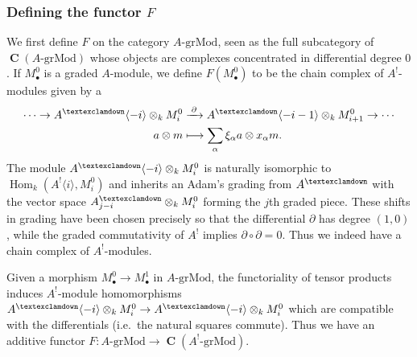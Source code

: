 \documentclass[a4paper]{article}
\theoremstyle{definition}
\theoremstyle{remark}
\newcommand{\grMod}{\ensuremath{\text{-grMod}}}
\DeclareMathOperator{\Hom}{\text{Hom}}
\DeclareMathOperator{\Ch}{\mathbf{C}}
\newcommand{\gnab}{{\textexclamdown}}
\begin{document}
\subsubsection{Defining the functor \(F\)} 
We first define \(F\) on the category \(A\grMod\), seen as the full subcategory of
\(\Ch(A\grMod)\) whose objects are complexes concentrated in differential degree
\(0\). If \(M^0_\bullet\) is a graded \(A\)-module, we define \(F(M^0_\bullet)\)
to be the chain complex of \(A^!\)-modules given by a
\begin{align*} 
    \cdots \rightarrow A^\gnab\langle -i \rangle \otimes_k M^0_i
    &\xrightarrow{\;\partial\;} A^\gnab \langle -i-1 \rangle \otimes_k
    M^0_{i+1} \rightarrow \cdots \\ 
    a\otimes m &\longmapsto \sum_\alpha \xi_\alpha a \otimes x_\alpha m.  
\end{align*} 
The module \(A^\gnab\langle -i \rangle \otimes_k M^0_i\) is naturally
isomorphic to \(\Hom_k(A^!\langle i \rangle, M^0_i)\) and inherits an Adam's
grading from \(A^\gnab\) with the vector space \(A^\gnab_{j-i}\otimes_k M^0_i\)
forming the \(j\)th graded piece. These shifts in grading have been chosen
precisely so that the differential \(\partial\) has degree \((1,0)\),  while
the graded commutativity of \(A^!\) implies \(\partial\circ \partial=0\).
Thus we indeed have a chain complex of \(A^!\)-modules. 

Given a morphism \(M^0_\bullet \rightarrow M^1_\bullet\) in \(A\grMod\),
the functoriality of tensor products induces \(A^!\)-module
homomorphisms \(A^\gnab\langle-i \rangle \otimes_k M^0_i \rightarrow
A^\gnab\langle-i\rangle \otimes_k M^0_i\) which are compatible with the
differentials (i.e.\ the natural squares commute). Thus we have an additive functor
\({F:A\grMod\rightarrow \Ch(A^!\grMod)}\).
\end{document}
